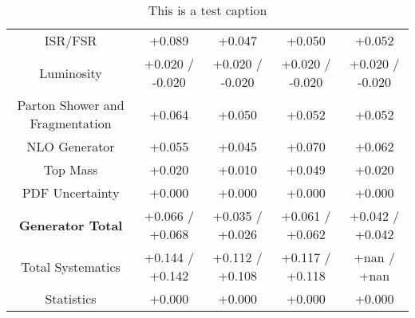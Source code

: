 \begin{table}[htbp]
\begin{center}
\begin{tabular}{|c|c|c|c|c|}
ISR/FSR                               &+0.089              & +0.047              & +0.050              & +0.052             \\
Luminosity                            &+0.020   / -0.020   & +0.020   / -0.020   & +0.020   / -0.020   & +0.020   / -0.020  \\
Parton Shower and Fragmentation       &+0.064              & +0.050              & +0.052              & +0.052             \\
NLO Generator                         &+0.055              & +0.045              & +0.070              & +0.062             \\
Top Mass                              &+0.020              & +0.010              & +0.049              & +0.020             \\
PDF Uncertainty                       &+0.000              & +0.000              & +0.000              & +0.000             \\
\hline
\textbf{Generator Total}              &+0.066   / +0.068   & +0.035   / +0.026   & +0.061   / +0.062   & +0.042   / +0.042  \\
\hline
\hline
Total Systematics                     &+0.144   / +0.142   & +0.112   / +0.108   & +0.117   / +0.118   & +nan     / +nan    \\
Statistics                            &+0.000              & +0.000              & +0.000              & +0.000             \\
\hline
  \end{tabular}
  \end{center} 
  \label{tab:xsec_nominal_coscos_op_high}
  \caption{This is a test caption}
\end{table}
 
